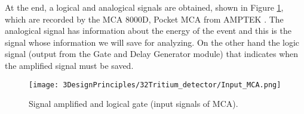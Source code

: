 At the end, a logical and analogical signals are obtained, shown in Figure \ref{fig:InputSignalsMCA}, which are recorded by the MCA 8000D, Pocket MCA from AMPTEK \cite{DataSheetMCA}. The analogical signal has information about the energy of the event and this is the signal whose information we will save for analyzing. On the other hand the logic signal (output from the Gate and Delay Generator module) that indicates when the amplified signal must be saved.

\begin{figure}[htbp]
\centering
\texttt{[image: 3DesignPrinciples/32Tritium\_detector/Input\_MCA.png]}
\caption{Signal amplified and logical gate (input signals of MCA).\label{fig:InputSignalsMCA}}
\end{figure}


